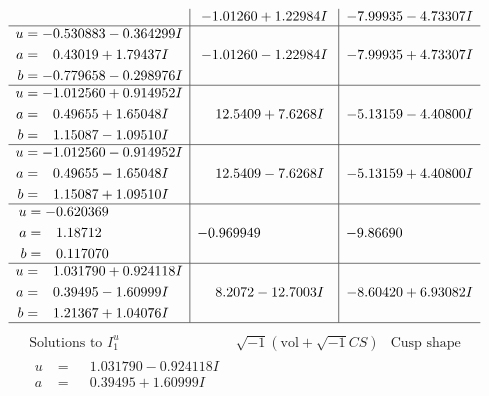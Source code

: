 \documentclass[1p]{elsarticle_modified}
\theoremstyle{definition}
\newcommand{\I}{\sqrt{-1}}
\begin{document}
$$\begin{array}{c|c|c}
 & -1.01260 + 1.22984 I & -7.99935 - 4.73307 I \\ \hline\begin{aligned}
u &= -0.530883 - 0.364299 I \\
a &= \phantom{-}0.43019 + 1.79437 I \\
b &= -0.779658 - 0.298976 I\end{aligned}
 & -1.01260 - 1.22984 I & -7.99935 + 4.73307 I \\ \hline\begin{aligned}
u &= -1.012560 + 0.914952 I \\
a &= \phantom{-}0.49655 + 1.65048 I \\
b &= \phantom{-}1.15087 - 1.09510 I\end{aligned}
 & \phantom{-}12.5409 + 7.6268 I & -5.13159 - 4.40800 I \\ \hline\begin{aligned}
u &= -1.012560 - 0.914952 I \\
a &= \phantom{-}0.49655 - 1.65048 I \\
b &= \phantom{-}1.15087 + 1.09510 I\end{aligned}
 & \phantom{-}12.5409 - 7.6268 I & -5.13159 + 4.40800 I \\ \hline\begin{aligned}
u &= -0.620369\phantom{ +0.000000I} \\
a &= \phantom{-}1.18712\phantom{ +0.000000I} \\
b &= \phantom{-}0.117070\phantom{ +0.000000I}\end{aligned}
 & -0.969949\phantom{ +0.000000I} & -9.86690\phantom{ +0.000000I} \\ \hline\begin{aligned}
u &= \phantom{-}1.031790 + 0.924118 I \\
a &= \phantom{-}0.39495 - 1.60999 I \\
b &= \phantom{-}1.21367 + 1.04076 I\end{aligned}
 & \phantom{-}8.2072 - 12.7003 I & -8.60420 + 6.93082 I\\
 \hline 
 \end{array}$$\newpage$$\begin{array}{c|c|c}  
\text{Solutions to }I^u_{1}& \I (\text{vol} + \sqrt{-1}CS) & \text{Cusp shape}\\
 \hline 
\begin{aligned}
u &= \phantom{-}1.031790 - 0.924118 I \\
a &= \phantom{-}0.39495 + 1.60999 I \\

\end{aligned}
\end{array}$$
\end{document}
